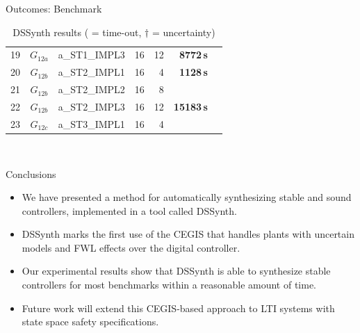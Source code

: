 \documentclass{beamer}
\newcommand\tool{{\sf DSSynth}\xspace}
\newcommand{\xmark}{\ding{55}}
\begin{document}
\begin{frame}[fragile]{Outcomes: Benchmark}
\begin{table}
{\begin{tabular}{| r | c | l | r r || r | r |}
19 &$G_{12a}$& a\_ST1\_IMPL3
            &  16 &  12 & \textbf{8772\,s}   & \xmark   \\
20 &$G_{12b}$& a\_ST2\_IMPL1
            &  16 &   4 & \textbf{1128\,s}  & \xmark   \\
21 &$G_{12b}$& a\_ST2\_IMPL2
            &  16 &   8 & \xmark  & \xmark    \\
22 &$G_{12b}$& a\_ST2\_IMPL3
            &  16 &  12 & \textbf{15183\,s} & \xmark   \\ 
23 &$G_{12c}$& a\_ST3\_IMPL1
            &  16 &   4 & \xmark & \xmark   \\\hline
\end{tabular}}\\[0.2ex]
\caption{\tool results ({\xmark} = time-out, $\dagger$ = 
uncertainty)
\label{tab:results}}
\end{table}
\end{frame} 

\begin{frame}{Conclusions}
\begin{itemize}
\item We have presented a method for automatically synthesizing stable and sound controllers, implemented
in a tool called \tool.
\item \tool marks the first use of the
CEGIS that handles plants with uncertain models and FWL effects over the
digital controller.  
\item Our experimental results show that \tool is able to synthesize
stable controllers for most benchmarks within a reasonable amount of time.  
\item Future work will extend this CEGIS-based
approach to LTI systems with state space safety specifications. 
\end{itemize}
\end{frame}
\end{document}
